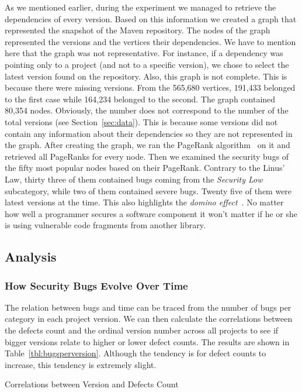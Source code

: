 \documentclass[conference]{llncs}
\begin{document}
As we mentioned earlier, during the experiment we managed to retrieve the
dependencies of every version. Based on this information we created a graph
that represented the snapshot of the Maven repository. The
nodes of the graph represented the versions and the vertices their dependencies.
We have to mention here that the graph was not representative. For instance, if
a dependency was pointing only to a project (and not to a specific version), we chose to
select the latest version found on the repository. Also, this graph is not
complete. This is because there were missing versions.
From the 565,680 vertices, 191,433
belonged to the first case while 164,234 belonged to the second.
The graph contained 80,354 nodes. Obviously, the number does not correspond to
the number of the total versions (see Section~\ref{sec:data}). This is because
some versions did not contain any information about their dependencies so they
are not represented in the graph. After creating the graph, we ran the PageRank
algorithm~\cite{BP98} on it and retrieved all PageRanks for every node. Then we
examined the security bugs of the fifty most popular nodes based on their PageRank.
Contrary to the Linus' Law, thirty three of them contained bugs coming from the
{\it Security Low} subcategory, while two of them contained severe bugs.
Twenty five of them were latest versions at the time. This also highlights
the {\it domino effect}~\cite{TH04}. No matter how well a programmer secures a software component
it won't matter if he or she is using vulnerable code fragments from another library.

\subsection{Analysis}
\label{sec:analysis}

\subsubsection{How Security Bugs Evolve Over Time}

The relation between bugs and time can be traced from the number of
bugs per category in each project version. We can then calculate the
correlations between the defects count and the ordinal version number
across all projects to see if bigger versions relate to higher or
lower defect counts. The results are shown in
Table~\ref{tbl:bugsperversion}. Although the tendency is for
defect counts to increase, this tendency is extremely slight.
\begin{table}
    \centering
    \caption{Correlations between Version and Defects Count}
    \label{tbl:bugsperversion}
    
\end{table}
\end{document}
